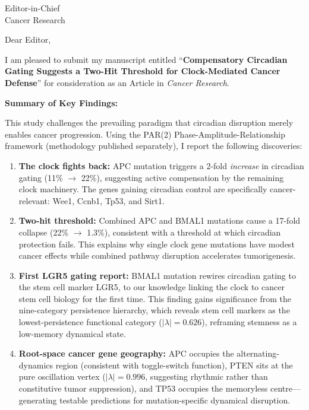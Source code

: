 \documentclass[11pt]{letter}
\begin{document}
\begin{letter}{Editor-in-Chief \\ Cancer Research}

\opening{Dear Editor,}

I am pleased to submit my manuscript entitled ``\textbf{Compensatory Circadian Gating Suggests a Two-Hit Threshold for Clock-Mediated Cancer Defense}'' for consideration as an Article in \textit{Cancer Research}.

\textbf{Summary of Key Findings:}

This study challenges the prevailing paradigm that circadian disruption merely enables cancer progression. Using the PAR(2) Phase-Amplitude-Relationship framework (methodology published separately), I report the following discoveries:

\begin{enumerate}
\item \textbf{The clock fights back:} APC mutation triggers a 2-fold \textit{increase} in circadian gating (11\% $\rightarrow$ 22\%), suggesting active compensation by the remaining clock machinery. The genes gaining circadian control are specifically cancer-relevant: Wee1, Ccnb1, Tp53, and Sirt1.

\item \textbf{Two-hit threshold:} Combined APC and BMAL1 mutations cause a 17-fold collapse (22\% $\rightarrow$ 1.3\%), consistent with a threshold at which circadian protection fails. This explains why single clock gene mutations have modest cancer effects while combined pathway disruption accelerates tumorigenesis.

\item \textbf{First LGR5 gating report:} BMAL1 mutation rewires circadian gating to the stem cell marker LGR5, to our knowledge linking the clock to cancer stem cell biology for the first time. This finding gains significance from the nine-category persistence hierarchy, which reveals stem cell markers as the lowest-persistence functional category ($|\lambda| = 0.626$), reframing stemness as a low-memory dynamical state.

\item \textbf{Root-space cancer gene geography:} APC occupies the alternating-dynamics region (consistent with toggle-switch function), PTEN sits at the pure oscillation vertex ($|\lambda| = 0.996$, suggesting rhythmic rather than constitutive tumor suppression), and TP53 occupies the memoryless centre---generating testable predictions for mutation-specific dynamical disruption.


\end{enumerate}
\end{letter}
\end{document}
